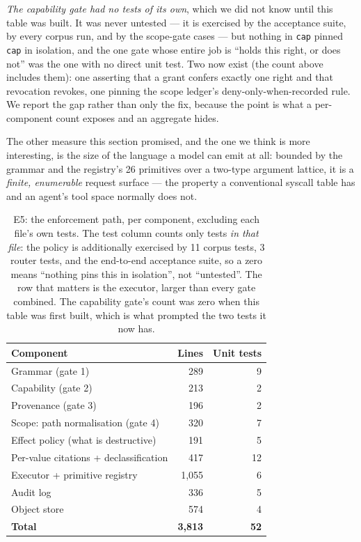 \documentclass[11pt]{article}
\newcommand{\code}[1]{\texttt{#1}}
\begin{document}
\emph{The capability gate had no tests of its own}, which we did not know until
this table was built. It was never untested --- it is exercised by the acceptance
suite, by every corpus run, and by the scope-gate cases --- but nothing in
\code{cap} pinned \code{cap} in isolation, and the one gate whose entire job is
``holds this right, or does not'' was the one with no direct unit test. Two now
exist (the count above includes them): one asserting that a grant confers exactly
one right and that revocation revokes, one pinning the scope ledger's
deny-only-when-recorded rule. We report the gap rather than only the fix, because
the point is what a per-component count exposes and an aggregate hides.

The other measure this section promised, and the one we think is more
interesting, is the size of the language a model can emit at all: bounded by the
grammar and the registry's 26 primitives over a two-type argument lattice, it is
a \emph{finite, enumerable} request surface --- the property a conventional
syscall table has and an agent's tool space normally does not.

\begin{table}[t]
\centering
\small
\begin{tabular}{@{}lrr@{}}
\toprule
\textbf{Component} & \textbf{Lines} & \textbf{Unit tests} \\
\midrule
Grammar (gate 1) & 289 & 9 \\
Capability (gate 2) & 213 & 2 \\
Provenance (gate 3) & 196 & 2 \\
Scope: path normalisation (gate 4) & 320 & 7 \\
Effect policy (what is destructive) & 191 & 5 \\
Per-value citations + declassification & 417 & 12 \\
Executor + primitive registry & 1{,}055 & 6 \\
Audit log & 336 & 5 \\
Object store & 574 & 4 \\
\midrule
\textbf{Total} & \textbf{3{,}813} & \textbf{52} \\
\bottomrule
\end{tabular}
\caption{E5: the enforcement path, per component, excluding each file's own
tests. The test column counts only tests \emph{in that file}: the policy is
additionally exercised by 11 corpus tests, 3 router tests, and the end-to-end
acceptance suite, so a zero means ``nothing pins this in isolation'', not
``untested''. The row that matters is the executor, larger than every gate
combined. The capability gate's count was zero when this table was first built,
which is what prompted the two tests it now has.}
\label{tab:e5}
\end{table}
\end{document}
